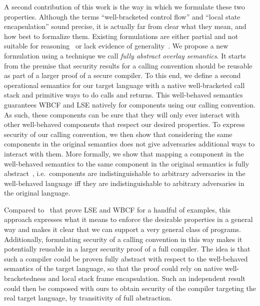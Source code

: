 \documentclass[acmsmall,screen]{acmart}\settopmatter{}
\begin{document}
A second contribution of this work is the way in which we formulate these two properties.
Although the terms ``well-bracketed control flow'' and ``local state encapsulation'' sound precise, it is actually far from clear what they mean, and how best to formalize them.
Existing formulations are either partial and not suitable for reasoning~\cite{abadi_control-flow_2005} or lack evidence of generality~\cite{skorstengaard_reasoning_2017}.
We propose a new formulation using a technique we call {\itshape fully abstract overlay semantics}.
It starts from the premise that security results for a calling convention should be reusable as part of a larger proof of a secure compiler.
To this end, we define a second operational semantics for our target language with a native well-bracketed call stack and primitive ways to do calls and returns.
This well-behaved semantics guarantees WBCF and LSE natively for components using our calling convention.
As such, these components can be sure that they will only ever interact with other well-behaved components that respect our desired properties.
To express security of our calling convention, we then show that considering the same components in the original semantics does not give adversaries additional ways to interact with them. 
More formally, we show that mapping a component in the well-behaved semantics to the same component in the original semantics is fully abstract~\cite{abadi_protection_1999}, i.e.\ components are indistinguishable to arbitrary adversaries in the well-behaved language iff they are indistinguishable to arbitrary adversaries in the original language.

Compared to~\citet{skorstengaard_reasoning_2017} that prove LSE and WBCF for a handful of examples,
this approach expresses what it means to enforce the desirable properties in a general way and makes it clear that we can support a very general class of programs.
Additionally, formulating security of a calling convention in this way makes it potentially reusable in a larger security proof of a full compiler.
The idea is that such a compiler could be proven fully abstract with respect to the well-behaved semantics of the target language, so that the proof could rely on native well-bracketedness and local stack frame encapsulation.
Such an independent result could then be composed with ours to obtain security of the compiler targeting the real target language, by transitivity of full abstraction.
\end{document}
